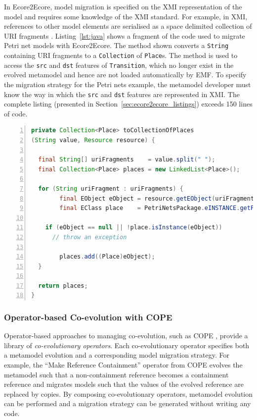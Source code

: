 In Ecore2Ecore, model migration is specified on the XMI representation of the model and requires some knowledge of the XMI standard. For example, in XMI, references to other model elements are serialised as a space delimited collection of URI fragments \cite{steinberg09emf}. Listing~\ref{lst:java} shows a fragment of the code used to migrate Petri net models with Ecore2Ecore. The method shown converts a \texttt{String} containing URI fragments to a \texttt{Collection} of \texttt{Place}s. The method is used to access the \texttt{src} and \texttt{dst} features of \texttt{Transition}, which no longer exist in the evolved metamodel and hence are not loaded automatically by EMF. To specify the migration strategy for the Petri nets example, the metamodel developer must know the way in which the \texttt{src} and \texttt{dst} features are represented in XMI. The complete listing (presented in Section~\ref{sec:ecore2ecore_listings}) exceeds 150 lines of code.

\begin{lstlisting}[basicstyle=\ttfamily\footnotesize, flexiblecolumns=true, numbers=left, nolol=true, caption=Java method for deserialising a reference., label=lst:java, language=Java, tabsize=2]
private Collection<Place> toCollectionOfPlaces
(String value, Resource resource) {

  final String[] uriFragments    = value.split(" ");
  final Collection<Place> places = new LinkedList<Place>();
 
  for (String uriFragment : uriFragments) {
		final EObject eObject = resource.getEObject(uriFragment);
		final EClass place    = PetriNetsPackage.eINSTANCE.getPlace();

    if (eObject == null || !place.isInstance(eObject))
      // throw an exception
						
		places.add((Place)eObject);
  }
 
  return places;
}
\end{lstlisting}

\subsubsection{Operator-based Co-evolution with COPE}
\label{subsubsec:cope}

Operator-based approaches to managing co-evolution, such as COPE \cite{herrmannsdoerfer09cope}, provide a library of \emph{co-evolutionary operators}. Each co-evolutionary operator specifies both a metamodel evolution and a corresponding model migration strategy. For example, the ``Make Reference Containment'' operator from COPE \cite{herrmannsdoerfer09cope} evolves the metamodel such that a non-containment reference becomes a containment reference and migrates models such that the values of the evolved reference are replaced by copies. By composing co-evolutionary operators, metamodel evolution can be performed and a migration strategy can be generated without writing any code.

